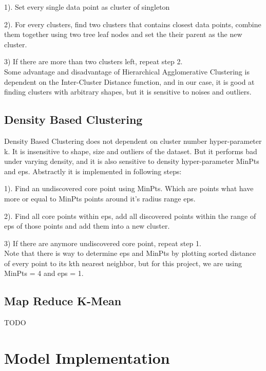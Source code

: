 \documentclass[fleqn]{llncs}
\begin{document}
1). Set every single data point as cluster of singleton

2). For every clusters, find two clusters that contains closest data points, combine them together using two tree leaf nodes and set the their parent as the new cluster.

3) If there are more than two clusters left, repeat step 2.\\
Some advantage and disadvantage of Hierarchical Agglomerative Clustering is dependent on the Inter-Cluster Distance function, and in our case, it is good at finding clusters with arbitrary shapes, but it is sensitive to noises and outliers. 

\subsection{Density Based Clustering}
Density Based Clustering does not dependent on cluster number hyper-parameter k. It is insensitive to shape, size and outliers of the dataset. But it performs bad under varying density, and it is also sensitive to density hyper-parameter MinPts and eps. Abstractly it is implemented in following steps:

1). Find an undiscovered core point using MinPts. Which are points what have more or equal to MinPts points around it's radius range eps.

2). Find all core points within eps, add all discovered points within the range of eps of those points and add them into a new cluster.

3) If there are anymore undiscovered core point, repeat step 1.\\
Note that there is way to determine eps and MinPts by plotting sorted distance of every point to its kth nearest neighbor, but for this project, we are using MinPts = 4 and eps = 1.
\subsection{Map Reduce K-Mean}
TODO
\section{Model Implementation}
\end{document}
